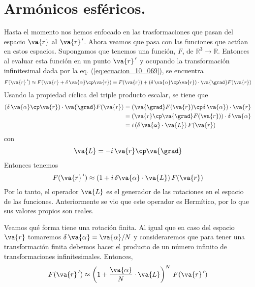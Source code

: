 \section{Armónicos esféricos.}
Hasta el momento nos hemos enfocado en las trasformaciones que pasan del espacio $\va{r}$ al $\va{r}^{\, \prime}$. Ahora veamos que pasa con las funciones que actúan en estos espacios. Supongamos que tenemos una función, $F$, de $\mathbb{R}^{3} \rightarrow \mathbb{R}$. Entonces al evaluar esta función en un punto $\va{r}^{\, \prime}$ y ocupando la transformación infinitesimal dada por la eq. (\ref{eq:ecuacion_10_069}), se encuentra
\begin{align}
F(\va{r}^{\, \prime}) \approx F (\va{r} + \delta \, \va{\alpha} \cp \va{r}) = F(\va{r}) + (\delta \, \va{\alpha} \cp \va{r}) \cdot \va{\grad} F(\va{r})
\label{eq:ecuacion_10_096}
\end{align}
Usando la propiedad cíclica del triple producto escalar, se tiene que
\begin{align*}
(\delta \, \va{\alpha} \cp \va{r}) \cdot \va{\grad} F(\va{r}) &= (\va{\grad} F(\va{r}) \cp \delta \, \va{\alpha}) \cdot \va{r} \\
&= (\va{r} \cp \va{\grad} F(\va{r})) \cdot \delta \, \va{\alpha} \\
&= i \, (\delta \, \va{\alpha} \cdot \va{L}) \, F(\va{r}) 
\end{align*}
con
\begin{align}
\va{L} = - i \, \va{r} \cp \va{\grad}
\label{eq:ecuacion_10_097}
\end{align}
Entonces tenemos
\begin{align}
F(\va{r}^{\, \prime}) \approx (1 + i \, \delta \va{\alpha} \cdot \va{L}) \, F (\va{r})
\label{eq:ecuacion_10_098}
\end{align}
Por lo tanto, el operador $\va{L}$ es el generador de las rotaciones en el espacio de las funciones. Anteriormente se vio que este operador es Hermítico, por lo que sus valores propios son reales.
\par
Veamos qué forma tiene una rotación finita. Al igual que en caso del espacio $\va{r}$ tomaremos $\delta \, \va{\alpha} = \va{\alpha} / N$ y consideraremos que para tener una transformación finita debemos hacer el producto de un número infinito de transformaciones infinitesimales. Entonces,
\begin{align}
F(\va{r}^{\, \prime}) \approx \left( 1 + \dfrac{\va{\alpha}}{N} \cdot \va{L} \right)^{N} \, F(\va{r}^{\, \prime})
\label{eq:ecuacion_10_099}
\end{align}
